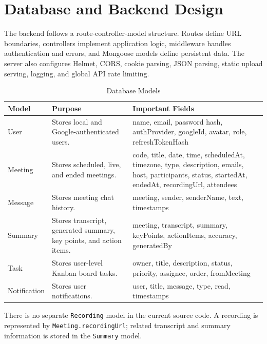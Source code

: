 \documentclass[11pt,a4paper]{article}
\begin{document}
\newpage

\section{Database and Backend Design}
The backend follows a route-controller-model structure. Routes define URL boundaries, controllers implement application logic, middleware handles authentication and errors, and Mongoose models define persistent data. The server also configures Helmet, CORS, cookie parsing, JSON parsing, static upload serving, logging, and global API rate limiting.

\begin{table}[H]
\centering
\small
{}
\begin{tabularx}{\linewidth}{L{2.4cm} Y Y}
\toprule
\textbf{Model} & \textbf{Purpose} & \textbf{Important Fields}\\
\midrule
User & Stores local and Google-authenticated users. & name, email, password hash, authProvider, googleId, avatar, role, refreshTokenHash\\
Meeting & Stores scheduled, live, and ended meetings. & code, title, date, time, scheduledAt, timezone, type, description, emails, host, participants, status, startedAt, endedAt, recordingUrl, attendees\\
Message & Stores meeting chat history. & meeting, sender, senderName, text, timestamps\\
Summary & Stores transcript, generated summary, key points, and action items. & meeting, transcript, summary, keyPoints, actionItems, accuracy, generatedBy\\
Task & Stores user-level Kanban board tasks. & owner, title, description, status, priority, assignee, order, fromMeeting\\
Notification & Stores user notifications. & user, title, message, type, read, timestamps\\
\bottomrule
\end{tabularx}
\caption{Database Models}
\label{tab:models}
\end{table}

There is no separate \texttt{Recording} model in the current source code. A recording is represented by \texttt{Meeting.recordingUrl}; related transcript and summary information is stored in the \texttt{Summary} model.
\end{document}
